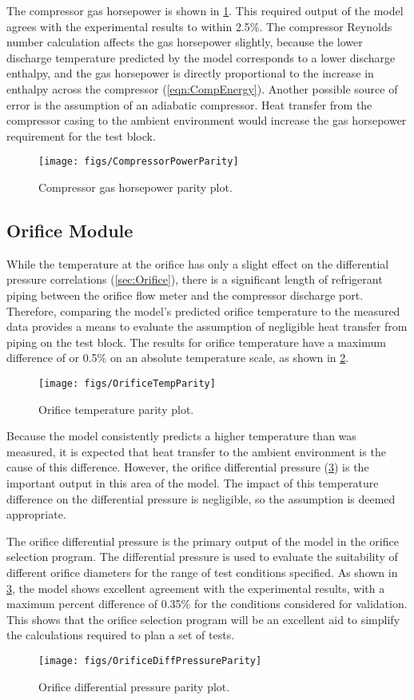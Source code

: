 The compressor gas horsepower is shown in \cref{fig:PowerParity}.
This required output of the model agrees with the experimental results
to within 2.5\%.
The compressor Reynolds number calculation affects the gas horsepower slightly,
because the lower discharge temperature predicted by the model
corresponds to a lower discharge enthalpy,
and the gas horsepower is directly proportional to the increase in enthalpy
across the compressor (\cref{eqn:CompEnergy}).
Another possible source of error is the assumption of an adiabatic
compressor.
Heat transfer from the compressor casing to the ambient environment
would increase the gas horsepower requirement for the test block.
\begin{figure}[tbp]
  \centering
  \texttt{[image: figs/CompressorPowerParity]}
  \caption{Compressor gas horsepower parity plot.}
  \label{fig:PowerParity}
\end{figure}

\subsection{Orifice Module} \label{sec:OrifResults}
While the temperature at the orifice has only a slight effect
on the differential pressure correlations (\cref{sec:Orifice}),
there is a significant length of refrigerant piping
between the orifice flow meter and the compressor discharge port.
Therefore, comparing the model's predicted orifice temperature to the 
measured data provides a means to evaluate the assumption
of negligible heat transfer from piping on the test block.
The results for orifice temperature have a maximum
difference of  or 0.5\% on an absolute temperature scale, 
as shown in \cref{fig:OrificeTempParity}.
\begin{figure}[tbp]
  \centering
  \texttt{[image: figs/OrificeTempParity]}
  \caption{Orifice temperature parity plot.}
  \label{fig:OrificeTempParity}
\end{figure}
Because the model consistently predicts a higher temperature
than was measured, it is expected that heat transfer to the
ambient environment is the cause of this difference.
However, the orifice differential pressure (\cref{fig:OrificeDiffParity})
is the important output in this area of the model.
The impact of this temperature difference on the differential pressure is negligible,
so the assumption is deemed appropriate.

The orifice differential pressure is the primary output of the model
in the orifice selection program.
The differential pressure is used to evaluate the suitability
of different orifice diameters for the range of test conditions specified.
As shown in \cref{fig:OrificeDiffParity}, the model shows excellent 
agreement with the experimental results, with a maximum percent difference
of 0.35\% for the conditions considered for validation.
This shows that the orifice selection program will be an excellent 
aid to simplify the calculations required to plan a set of tests.
\begin{figure}[tbp]
  \centering
  \texttt{[image: figs/OrificeDiffPressureParity]}
  \caption{Orifice differential pressure parity plot.}
  \label{fig:OrificeDiffParity}
\end{figure}

